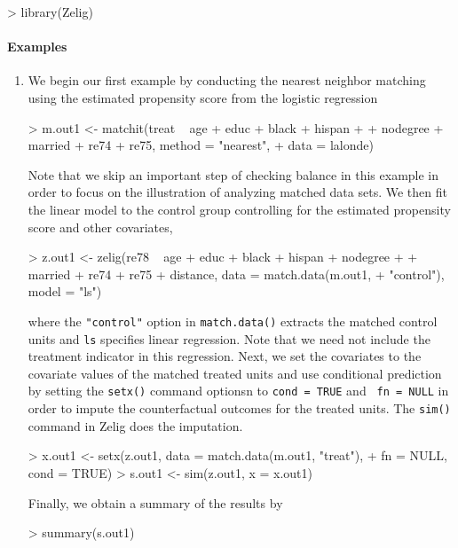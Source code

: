 \begin{Schunk}
\begin{Sinput}
> library(Zelig)
\end{Sinput}
\end{Schunk}

\paragraph{Examples}
\begin{enumerate}
\item We begin our first example by conducting the nearest neighbor
  matching using the estimated propensity score from the logistic
  regression
\begin{Schunk}
\begin{Sinput}
> m.out1 <- matchit(treat ~ age + educ + black + hispan + 
+     nodegree + married + re74 + re75, method = "nearest", 
+     data = lalonde)
\end{Sinput}
\end{Schunk}
Note that we skip an important step of checking balance in this
example in order to focus on the illustration of analyzing matched
data sets. We then fit the linear model to the control group
controlling for the estimated propensity score and other covariates,
\begin{Schunk}
\begin{Sinput}
> z.out1 <- zelig(re78 ~ age + educ + black + hispan + nodegree + 
+     married + re74 + re75 + distance, data = match.data(m.out1, 
+     "control"), model = "ls")
\end{Sinput}
\end{Schunk}
where the {\tt "control"} option in {\tt match.data()} extracts the
matched control units and {\tt ls} specifies linear regression. Note
that we need not include the treatment indicator in this regression.
Next, we set the covariates to the covariate values of the matched treated units
and use conditional prediction by setting the {\tt setx()} command optionsn to {\tt cond = TRUE} and {\tt
  fn = NULL} in order to impute the
counterfactual outcomes for the treated units. The {\tt sim()} command in
Zelig does the imputation.
\begin{Schunk}
\begin{Sinput}
> x.out1 <- setx(z.out1, data = match.data(m.out1, "treat"), 
+     fn = NULL, cond = TRUE)
> s.out1 <- sim(z.out1, x = x.out1)
\end{Sinput}
\end{Schunk}
Finally, we obtain a summary of the results by 
\begin{Schunk}
\begin{Sinput}
> summary(s.out1)
\end{Sinput}
\begin{Soutput}


\end{Soutput}
\end{Schunk}
\end{enumerate}
